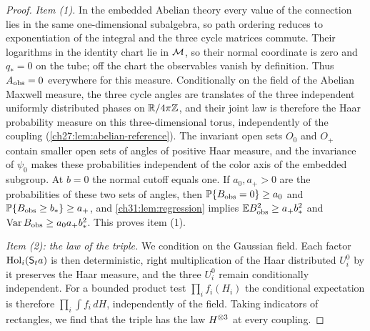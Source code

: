 \begin{proof}
\emph{Item (1).} In the embedded Abelian theory every value of the connection lies in the same one-dimensional subalgebra, so path ordering reduces to exponentiation of the integral and the three cycle matrices commute. Their logarithms in the identity chart lie in $\mathcal M$, so their normal coordinate is zero and $q_*=0$ on the tube; off the chart the observables vanish by definition. Thus $A_{\mathrm{obs}}=0$ everywhere for this measure. Conditionally on the field of the Abelian Maxwell measure, the three cycle angles are translates of the three independent uniformly distributed phases on $\mathbb R/4\pi\mathbb Z$, and their joint law is therefore the Haar probability measure on this three-dimensional torus, independently of the coupling (\cref{ch27:lem:abelian-reference}). The invariant open sets $O_0$ and $O_+$ contain smaller open sets of angles of positive Haar measure, and the invariance of $\psi_0$ makes these probabilities independent of the color axis of the embedded subgroup. At $b=0$ the normal cutoff equals one. If $a_0,a_+>0$ are the probabilities of these two sets of angles, then $\mathbb P\{B_{\mathrm{obs}}=0\}\ge a_0$ and $\mathbb P\{B_{\mathrm{obs}}\ge b_*\}\ge a_+$, and \cref{ch31:lem:regression} implies $\mathbb EB_{\mathrm{obs}}^2\ge a_+b_*^2$ and $\operatorname{Var}B_{\mathrm{obs}}\ge a_0a_+b_*^2$. This proves item (1).

\emph{Item (2): the law of the triple.} We condition on the Gaussian field. Each factor $\operatorname{Hol}_i(\mathsf S_ta)$ is then deterministic, right multiplication of the Haar distributed $U_i^0$ by it preserves the Haar measure, and the three $U_i^0$ remain conditionally independent. For a bounded product test $\prod_if_i(H_i)$ the conditional expectation is therefore $\prod_i\int f_i\,dH$, independently of the field. Taking indicators of rectangles, we find that the triple has the law $H^{\otimes3}$ at every coupling.


\end{proof}
